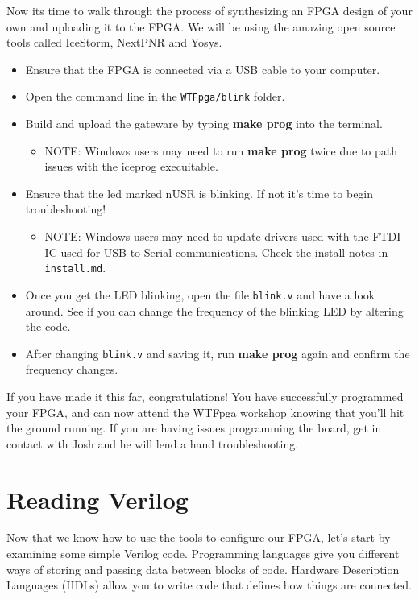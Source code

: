 \documentclass[12pt,a4paper]{article}
\begin{document}
\noindent
Now its time to walk through the process of synthesizing an FPGA design of your own and uploading it to the FPGA. We will be using the amazing open source tools called IceStorm, NextPNR and Yosys. 
\begin{itemize}
		\item Ensure that the FPGA is connected via a USB cable to your computer. 
		\item Open the command line in the \texttt{WTFpga/blink} folder.
		\item Build and upload the gateware by typing \textbf{make prog} into the terminal. 
			\begin{itemize}
				\item NOTE: Windows users may need to run \textbf{make prog} twice due to path issues with the iceprog execuitable. 
			\end{itemize}
		\item Ensure that the led marked nUSR is blinking. If not it's time to begin troubleshooting!
			\begin{itemize}
				\item NOTE: Windows users may need to update drivers used with the FTDI IC used for USB to Serial communications. Check the install notes in \texttt{install.md}.
			\end{itemize}
		\item Once you get the LED blinking, open the file \texttt{blink.v} and have a look around. See if you can change the frequency of the blinking LED by altering the code. 
		\item After changing \texttt{blink.v} and saving it, run \textbf{make prog} again and confirm the frequency changes. 
\end{itemize}
If you have made it this far, congratulations! You have successfully programmed your FPGA, and can now attend the WTFpga workshop knowing that you'll hit the ground running. If you are having issues programming the board, get in contact with Josh and he will lend a hand troubleshooting. 
\newpage
\section{Reading Verilog}
Now that we know how to use the tools to configure our FPGA, let’s start by examining some simple Verilog code. Programming languages give you different ways of storing and passing data between blocks of code. Hardware Description Languages (HDLs) allow you to write code that defines how things are connected. 
\end{document}
